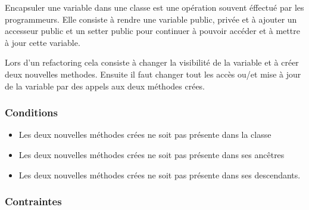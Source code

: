 \documentclass[a4paper, 12pt]{article}
\begin{document}
Encapsuler une variable dans une classe est une opération souvent éffectué par les programmeurs. 
Elle consiste à rendre une variable public, privée et à ajouter un accesseur public et un setter public pour continuer à pouvoir accéder et à mettre à jour cette variable.

Lors d'un refactoring cela consiste à changer la visibilité de la variable et à créer deux nouvelles methodes. Ensuite il faut changer tout les accès ou/et mise à jour de la variable par des appels aux deux méthodes crées.

\subsubsection{Conditions}

\begin{itemize}[label=\textbullet]
\item Les deux nouvelles méthodes crées ne soit pas présente dans la classe
\item Les deux nouvelles méthodes crées ne soit pas présente dans ses ancêtres 
\item Les deux nouvelles méthodes crées ne soit pas présente dans ses descendants.
\end{itemize}

\subsubsection{Contraintes}
\end{document}
